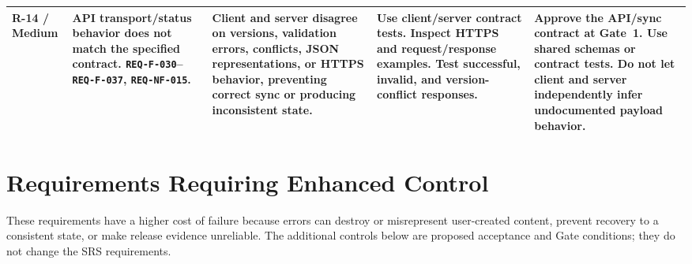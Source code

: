\documentclass[10pt,a4paper]{article}
\begin{document}
\begin{longtable}{|L{1.15cm}|L{3.1cm}|L{5.6cm}|L{4.4cm}|L{7.1cm}|}
R-14 / Medium &
API transport/status behavior does not match the specified contract. \texttt{REQ-F-030}--\texttt{REQ-F-037}, \texttt{REQ-NF-015}. &
Client and server disagree on versions, validation errors, conflicts, JSON representations, or HTTPS behavior, preventing correct sync or producing inconsistent state. &
Use client/server contract tests. Inspect HTTPS and request/response examples. Test successful, invalid, and version-conflict responses. &
Approve the API/sync contract at Gate~1. Use shared schemas or contract tests. Do not let client and server independently infer undocumented payload behavior. \\
\hline
\end{longtable}

\section{Requirements Requiring Enhanced Control}
\label{sec:controls}

These requirements have a higher cost of failure because errors can destroy or
misrepresent user-created content, prevent recovery to a consistent state, or
make release evidence unreliable. The additional controls below are proposed
acceptance and Gate conditions; they do not change the SRS requirements.
\end{document}
